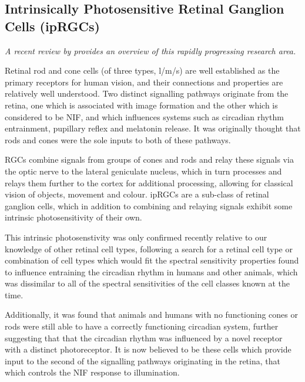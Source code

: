 \subsection{Intrinsically Photosensitive Retinal Ganglion Cells (ipRGCs)}

\textit{A recent review by \citet{spitschan_melanopsin_2019} provides an overview of this rapidly progressing research area.}

\bigskip

Retinal rod and cone cells (of three types, l/m/s) are well established as the primary receptors for human vision, and their connections and properties are relatively well understood. Two distinct signalling pathways originate from the retina, one which is associated with image formation and the other which is considered to be \gls{NIF}, and which influences systems such as circadian rhythm entrainment, pupillary reflex and melatonin release. It was originally thought that rods and cones were the sole inputs to both of these pathways\citep{hankins_melanopsin_2008}.

\Glspl{RGC} combine signals from groups of cones and rods and relay these signals via the optic nerve to the lateral geniculate nucleus, which in turn processes and relays them further to the cortex for additional processing, allowing for classical vision of objects, movement and colour. \Glspl{ipRGC} are a sub-class of retinal ganglion cells, which in addition to combining and relaying signals exhibit some intrinsic photosensitivity of their own. 

This intrinsic photosenstivity was only confirmed recently\citep{qiu_induction_2005} relative to our knowledge of other retinal cell types, following a search for a retinal cell type or combination of cell types which would fit the spectral sensitivity properties found to influence entraining the circadian rhythm in humans and other animals\citep{brainard_human_2001,brainard_action_2001}, which was dissimilar to all of the spectral sensitivities of the cell classes known at the time.

Additionally, it was found that animals and humans with no functioning cones or rods were still able to have a correctly functioning circadian system\citep{freedman_regulation_1999,zaidi_short-wavelength_2007}, further suggesting that that the circadian rhythm was influenced by a novel receptor with a distinct photoreceptor. It is now believed to be these cells which provide input to the second of the signalling pathways originating in the retina, that which controls the \gls{NIF} response to illumination.

